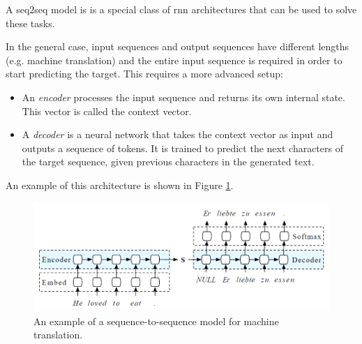 A \acrfull{seq2seq} model is  is a special class of \acrfull{rnn} architectures  that can be used to solve these tasks.

In the general case, input sequences and output sequences have different lengths (e.g. machine translation) and the entire input sequence is required in order to start predicting the target. This requires a more advanced setup:
\begin{itemize}
    \item An \emph{encoder} processes the input sequence and returns its own internal state. This vector is called the context vector.
    \item A \emph{decoder} is a neural network that takes the context vector as input and outputs a sequence of tokens. It is trained to predict the next characters of the target sequence, given previous characters in the generated text. 
\end{itemize}


An example of this architecture is shown in Figure \ref{fig:seq2seq}.


\begin{figure}[h]
    \centering
    \includegraphics[width=0.8\linewidth]{images/2_1_seq2seq.png}
    \caption{An example of a sequence-to-sequence model for machine translation.}
    \label{fig:seq2seq}
\end{figure}

\vspace{1cm}

